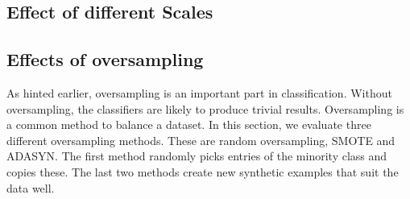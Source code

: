 \subsection{Effect of different Scales}



\subsection{Effects of oversampling}
As hinted earlier, oversampling is an important part in classification. Without oversampling, the classifiers are likely to produce trivial results. Oversampling is a common method to balance a dataset. In this section, we evaluate three different oversampling methods. These are random oversampling, SMOTE and ADASYN. The first method randomly picks entries of the minority class and copies these. The last two methods create new synthetic examples that suit the data well.










